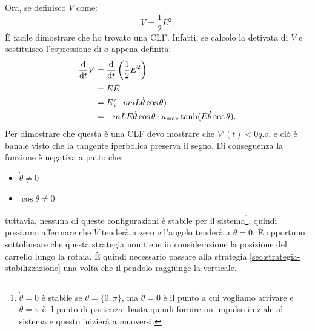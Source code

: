 Ora, se definisco $V$ come:
\begin{equation}
    V = \frac 1 2 E^2.
    \label{eq:lyapunov-energy}
\end{equation}
È facile dimostrare che ho trovato una CLF. Infatti, se calcolo la detivata di $V$ e sostituisco l'espressione di $a$ appena definita:
\begin{equation}
    \begin{aligned}
        \frac {\text d} {\text d t} V &= \frac {\text d} {\text d t} \left( \frac 1 2 \dot E^2\right) \\
        &=  E \dot E \\
        &=  E (-maL \dot \theta \cos \theta) \\
        &= -mLE\dot \theta \cos \theta \cdot a_{\max} \tanh(E \dot \theta \cos \theta).
    \end{aligned}
    \label{eq:lyapunov-energy}
\end{equation}
Per dimostrare che questa è una CLF devo mostrare che $V'(t) < 0 q.o.$ e ciò è banale visto che la tangente iperbolica preserva il segno. Di conseguenza la funzione è negativa a patto che:
\begin{itemize}
    \item $\dot \theta \neq 0$
    \item $\cos \theta \neq 0$
\end{itemize}
tuttavia, nessuna di queste configurazioni è stabile per il sistema\footnote{$\dot \theta = 0$ è stabile se $\theta = \{0, \pi\}$, ma $\theta = 0$ è il punto a cui vogliamo arrivare e $\theta = \pi$ è il punto di partenza; basta quindi fornire un impulso iniziale al sistema e questo inizierà a muoversi.}, quindi possiamo affermare che $V$ tenderà a zero e l'angolo tenderà a $\theta = 0$.
È opportuno sottolineare che questa strategia non tiene in considerazione la posizione del carrello lungo la rotaia.
È quindi necessario passare alla strategia \ref{sec:strategia-stabilizzazione}
una volta che il pendolo raggiunge la verticale.